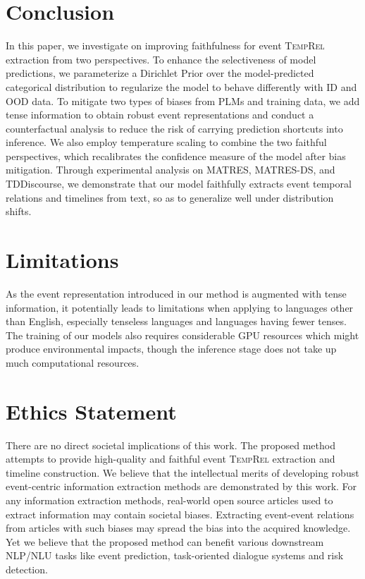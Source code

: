 \documentclass[11pt]{article}
\newcommand{\temprel}{\textsc{TempRel}\xspace}
\begin{document}
\section{Conclusion}
\label{sec:conclusion}
In this paper, we investigate on improving faithfulness for event \temprel extraction from two perspectives.
To enhance the selectiveness of model predictions, we parameterize a Dirichlet Prior over the model-predicted categorical distribution to regularize the model to behave differently with ID and OOD data.
To mitigate two types of biases from PLMs and training data, we add tense information to obtain robust event representations and conduct a counterfactual analysis to reduce the risk of carrying prediction shortcuts into inference.
We also employ temperature scaling to combine the two faithful perspectives, which recalibrates the confidence measure of the model after bias mitigation.
Through experimental analysis on MATRES, MATRES-DS, and TDDiscourse, we demonstrate that our model faithfully extracts event temporal relations and timelines from text, so as to generalize well under distribution shifts.


\section*{Limitations}
As the event representation introduced in our method is augmented with tense information, it potentially leads to limitations when applying to languages other than English, especially tenseless languages and languages having fewer tenses.
The training of our models also requires considerable GPU resources which might produce environmental impacts, though the inference stage does not take up much computational resources.

\section*{Ethics Statement}
There are no direct societal implications of this work. The proposed method attempts to provide high-quality and faithful event \temprel extraction and timeline construction. We believe that the intellectual merits of developing robust event-centric information extraction methods are demonstrated by this work.
For any information extraction methods, real-world open source articles used to extract information may contain societal biases.
Extracting event-event relations from articles with such biases may spread the bias into the acquired knowledge.
Yet we believe that the proposed method can benefit various downstream NLP/NLU tasks like event prediction, task-oriented dialogue systems and risk detection.
\end{document}
